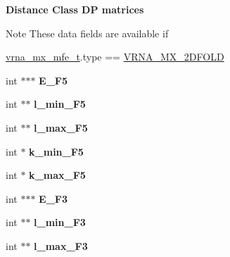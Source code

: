 \begin{Indent}{\bf Distance Class D\-P matrices}\par
{\em \begin{DoxyNote}{Note}
These data fields are available if 
\begin{DoxyCode}
\hyperlink{group__dp__matrices_structvrna__mx__mfe__s}{vrna\_mx\_mfe\_t}.type == \hyperlink{group__dp__matrices_gga6042ea1d58d01931e959791be6d89343ae656f8391445ff71bed8a597a0a19417}{VRNA\_MX\_2DFOLD} 
\end{DoxyCode}
 
\end{DoxyNote}
}\begin{DoxyCompactItemize}
\item 
\hypertarget{group__dp__matrices_ab917aa1e2b069af7fb5d11c5d067cdf0}{int $\ast$$\ast$$\ast$ {\bfseries E\-\_\-\-F5}}\label{group__dp__matrices_ab917aa1e2b069af7fb5d11c5d067cdf0}

\item 
\hypertarget{group__dp__matrices_a4035d3c6a9e23e388ddec18a9fdc2315}{int $\ast$$\ast$ {\bfseries l\-\_\-min\-\_\-\-F5}}\label{group__dp__matrices_a4035d3c6a9e23e388ddec18a9fdc2315}

\item 
\hypertarget{group__dp__matrices_a794ba42ca5afa5320a2da88554928516}{int $\ast$$\ast$ {\bfseries l\-\_\-max\-\_\-\-F5}}\label{group__dp__matrices_a794ba42ca5afa5320a2da88554928516}

\item 
\hypertarget{group__dp__matrices_aad6fc641a5815149b8d938ca277019a5}{int $\ast$ {\bfseries k\-\_\-min\-\_\-\-F5}}\label{group__dp__matrices_aad6fc641a5815149b8d938ca277019a5}

\item 
\hypertarget{group__dp__matrices_a321a00180a1d046796328d0a9b66ec81}{int $\ast$ {\bfseries k\-\_\-max\-\_\-\-F5}}\label{group__dp__matrices_a321a00180a1d046796328d0a9b66ec81}

\item 
\hypertarget{group__dp__matrices_a4d055707928eb6f3147c962141cc70e8}{int $\ast$$\ast$$\ast$ {\bfseries E\-\_\-\-F3}}\label{group__dp__matrices_a4d055707928eb6f3147c962141cc70e8}

\item 
\hypertarget{group__dp__matrices_abf0389ece58e97652f580d7dc1e133d8}{int $\ast$$\ast$ {\bfseries l\-\_\-min\-\_\-\-F3}}\label{group__dp__matrices_abf0389ece58e97652f580d7dc1e133d8}

\item 
\hypertarget{group__dp__matrices_afadce4435141575c7275b1e0b75e8eba}{int $\ast$$\ast$ {\bfseries l\-\_\-max\-\_\-\-F3}}\label{group__dp__matrices_afadce4435141575c7275b1e0b75e8eba}


\end{DoxyCompactItemize}
\end{Indent}
